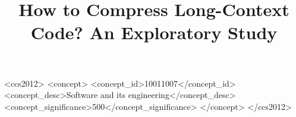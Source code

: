 \documentclass[sigconf,review,anonymous]{acmart}
\begin{document}
\sloppy

\title{How to Compress Long-Context Code? An Exploratory Study}






\begin{CCSXML}
<ccs2012>
   <concept>
       <concept_id>10011007</concept_id>
       <concept_desc>Software and its engineering</concept_desc>
       <concept_significance>500</concept_significance>
       </concept>
 </ccs2012>
\end{CCSXML}



\maketitle





\end{document}
